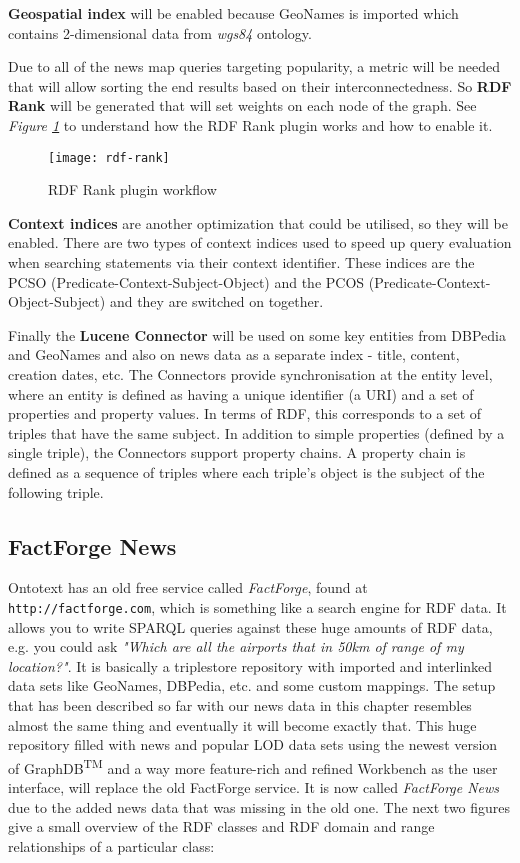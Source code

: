 \textbf{Geospatial index} will be enabled because GeoNames is imported which contains 2-dimensional data from \textit{wgs84} ontology.

Due to all of the news map queries targeting popularity,  a metric will be needed that will allow sorting the end results based on their interconnectedness. So \textbf{RDF Rank} will be generated that will set weights on each node of the graph. See \textit{Figure \ref{rdf-rank}} to understand how the RDF Rank plugin works and how to enable it.

\begin{figure}[h!]
    \texttt{[image: rdf-rank]}
    \caption{RDF Rank plugin workflow}
    \label{rdf-rank}
\end{figure}

\textbf{Context indices} are another optimization that could be utilised, so they will be enabled. There are two types of context indices used to speed up query evaluation when searching statements via their context identifier. These indices are the PCSO (Predicate-Context-Subject-Object) and the PCOS (Predicate-Context-Object-Subject) and they are switched on together.

Finally the \textbf{Lucene Connector} will be used on some key entities from DBPedia and GeoNames and also on news data as a separate index - title, content, creation dates, etc. The Connectors provide synchronisation at the entity level, where an entity is defined as having a unique identifier (a URI) and a set of properties and property values. In terms of RDF, this corresponds to a set of triples that have the same subject. In addition to simple properties (defined by a single triple), the Connectors support property chains. A property chain is defined as a sequence of triples where each triple’s object is the subject of the following triple.

\subsection{FactForge News}
Ontotext has an old free service called \textit{FactForge}, found at \texttt{http://factforge.com}, which is something like a search engine for RDF data. It allows you to write SPARQL queries against these huge amounts of RDF data, e.g. you could ask \textit{"Which are all the airports that in 50km of range of my location?"}. It is basically a triplestore repository with imported and interlinked data sets like GeoNames, DBPedia, etc. and some custom mappings. The setup that has been described so far with our news data in this chapter resembles almost the same thing and eventually it will become exactly that. This huge repository filled with news and popular LOD data sets using the newest version of GraphDB\textsuperscript{TM} and a way more feature-rich and refined Workbench as the user interface, will replace the old FactForge service. It is now called \textit{FactForge News} due to the added news data that was missing in the old one. The next two figures give a small overview of the RDF classes and RDF domain and range relationships of a particular class:

